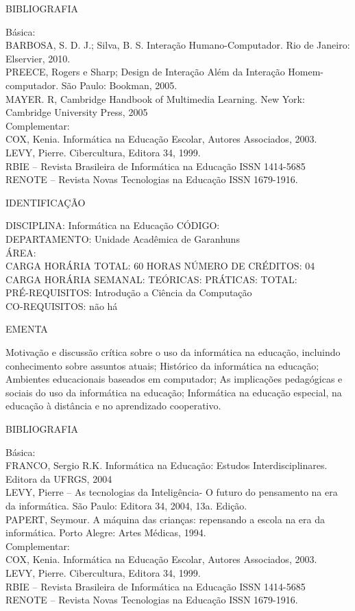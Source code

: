 \documentclass[
	12pt,				%
	openright,			%
  oneside,     %
	a4paper,			%
	english,			%
	french,				%
	spanish,			%
	brazil				%
	]{abntex2}
\begin{document}
\begin{apendicesenv}
BIBLIOGRAFIA 

Básica:\\
BARBOSA, S. D. J.; Silva, B. S. Interação Humano-Computador. Rio de
Janeiro: Elservier, 2010.\\
PREECE, Rogers e Sharp; Design de Interação  Além da Interação
Homem-computador. São Paulo: Bookman, 2005.\\
MAYER. R, Cambridge Handbook of Multimedia Learning. New York: Cambridge
University Press, 2005\\
Complementar:\\
COX, Kenia. Informática na Educação Escolar, Autores Associados, 2003.\\
LEVY, Pierre. Cibercultura, Editora 34, 1999.\\
RBIE -- Revista Brasileira de Informática na Educação ISSN 1414-5685\\
RENOTE -- Revista Novas Tecnologias na Educação ISSN 1679-1916.

\newpage IDENTIFICAÇÃO

DISCIPLINA: Informática na Educação CÓDIGO:\\ 
DEPARTAMENTO: Unidade Acadêmica de Garanhuns\\
ÁREA: \\
CARGA HORÁRIA TOTAL: 60 HORAS NÚMERO DE CRÉDITOS: 04\\
CARGA HORÁRIA SEMANAL: TEÓRICAS: PRÁTICAS: TOTAL:\\
PRÉ-REQUISITOS: Introdução a Ciência da Computação\\
CO-REQUISITOS: não há

EMENTA 

Motivação e discussão crítica sobre o uso da informática na educação,
incluindo conhecimento sobre assuntos atuais; Histórico da informática
na educação; Ambientes educacionais baseados em computador; As
implicações pedagógicas e sociais do uso da informática na educação;
Informática na educação especial, na educação à distância e no
aprendizado cooperativo.

BIBLIOGRAFIA 

Básica:\\
FRANCO, Sergio R.K. Informática na Educação: Estudos Interdisciplinares.
Editora da UFRGS, 2004\\
LEVY, Pierre -- As tecnologias da Inteligência- O futuro do pensamento
na era da informática. São Paulo: Editora 34, 2004, 13a. Edição.\\
PAPERT, Seymour. A máquina das crianças: repensando a escola na era da
informática. Porto Alegre: Artes Médicas, 1994.\\
Complementar:\\
COX, Kenia. Informática na Educação Escolar, Autores Associados, 2003.\\
LEVY, Pierre. Cibercultura, Editora 34, 1999.\\
RBIE -- Revista Brasileira de Informática na Educação ISSN 1414-5685\\
RENOTE -- Revista Novas Tecnologias na Educação ISSN 1679-1916.


\end{apendicesenv}
\end{document}
